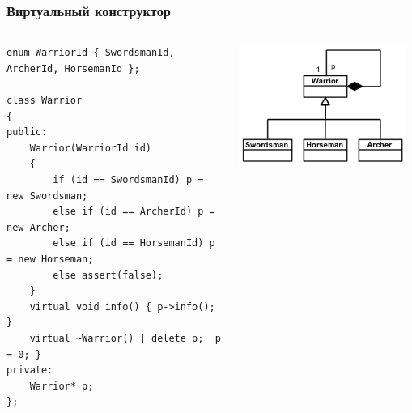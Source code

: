 \documentclass{../../slides-style}
\begin{document}
    \begin{frame}[fragile]
        \frametitle{Виртуальный конструктор}
        \begin{columns}
            \begin{column}{0.6\textwidth}
                \begin{footnotesize}
                    \begin{verbatim}
enum WarriorId { SwordsmanId, ArcherId, HorsemanId };

class Warrior
{
public:  
    Warrior(WarriorId id)
    {
        if (id == SwordsmanId) p = new Swordsman;
        else if (id == ArcherId) p = new Archer;
        else if (id == HorsemanId) p = new Horseman;
        else assert(false);
    }
    virtual void info() { p->info(); }
    virtual ~Warrior() { delete p;  p = 0; }
private:
    Warrior* p;
};
                    \end{verbatim}
                \end{footnotesize}
            \end{column}
            \begin{column}{0.4\textwidth}
                \begin{center}
                    \includegraphics[width=0.95\textwidth]{warriorVirtualCtor.png}
                \end{center}
            \end{column}
        \end{columns}
    \end{frame}
\end{document}
